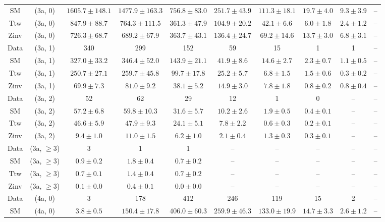 \begin{table}[h!]
{\begin{tabular}{cccccccccc}
	SM & (3a, 0) & $1605.7\pm 148.1$ & $1477.9\pm 163.3$ & $756.8\pm 83.0$ & $251.7\pm 43.9$ & $111.3\pm 18.1$ & $19.7\pm 4.0$ & $9.3\pm 3.9$ & -- \\[0.5ex] 
	Ttw & (3a, 0) & $847.9\pm 88.7$ & $764.3\pm 111.5$ & $361.3\pm 47.9$ & $104.9\pm 20.2$ & $42.1\pm 6.6$ & $6.0\pm 1.8$ & $2.4\pm 1.2$ & -- \\[0.5ex] 
	Zinv & (3a, 0) & $726.3\pm 68.7$ & $689.2\pm 67.9$ & $363.7\pm 43.1$ & $136.4\pm 24.7$ & $69.2\pm 14.6$ & $13.7\pm 3.0$ & $6.8\pm 3.1$ & -- \\[0.5ex] 
	Data & (3a, 1) & 340 & 299 & 152 & 59 & 15 & 1 & 1 & -- \\[0.5ex] 
	SM & (3a, 1) & $327.0\pm 33.2$ & $346.4\pm 52.0$ & $143.9\pm 21.1$ & $41.9\pm 8.6$ & $14.6\pm 2.7$ & $2.3\pm 0.7$ & $1.1\pm 0.5$ & -- \\[0.5ex] 
	Ttw & (3a, 1) & $250.7\pm 27.1$ & $259.7\pm 45.8$ & $99.7\pm 17.8$ & $25.2\pm 5.7$ & $6.8\pm 1.5$ & $1.5\pm 0.6$ & $0.3\pm 0.2$ & -- \\[0.5ex] 
	Zinv & (3a, 1) & $69.9\pm 7.3$ & $81.0\pm 9.2$ & $38.1\pm 5.2$ & $14.9\pm 3.0$ & $7.8\pm 1.8$ & $0.8\pm 0.2$ & $0.8\pm 0.4$ & -- \\[0.5ex] 
	Data & (3a, 2) & 52 & 62 & 29 & 12 & 1 & 0 & -- & -- \\[0.5ex] 
	SM & (3a, 2) & $57.2\pm 6.8$ & $59.8\pm 10.3$ & $31.6\pm 5.7$ & $10.2\pm 2.6$ & $1.9\pm 0.5$ & $0.4\pm 0.1$ & -- & -- \\[0.5ex] 
	Ttw & (3a, 2) & $46.6\pm 5.9$ & $47.9\pm 9.3$ & $24.1\pm 5.1$ & $7.8\pm 2.2$ & $0.6\pm 0.3$ & $0.2\pm 0.1$ & -- & -- \\[0.5ex] 
	Zinv & (3a, 2) & $9.4\pm 1.0$ & $11.0\pm 1.5$ & $6.2\pm 1.0$ & $2.1\pm 0.4$ & $1.3\pm 0.3$ & $0.3\pm 0.1$ & -- & -- \\[0.5ex] 
	Data & (3a, $\ge3$) & 3 & 1 & 1 & -- & -- & -- & -- & -- \\[0.5ex] 
	SM & (3a, $\ge3$) & $0.9\pm 0.2$ & $1.8\pm 0.4$ & $0.7\pm 0.2$ & -- & -- & -- & -- & -- \\[0.5ex] 
	Ttw & (3a, $\ge3$) & $0.7\pm 0.1$ & $1.4\pm 0.4$ & $0.7\pm 0.2$ & -- & -- & -- & -- & -- \\[0.5ex] 
	Zinv & (3a, $\ge3$) & $0.1\pm 0.0$ & $0.4\pm 0.1$ & $0.0\pm 0.0$ & -- & -- & -- & -- & -- \\[0.5ex] 
	Data & (4a, 0) & 3 & 178 & 412 & 246 & 119 & 15 & 2 & -- \\[0.5ex] 
	SM & (4a, 0) & $3.8\pm 0.5$ & $150.4\pm 17.8$ & $406.0\pm 60.3$ & $259.9\pm 46.3$ & $133.0\pm 19.9$ & $14.7\pm 3.3$ & $2.6\pm 1.2$ & -- \\[0.5ex] 

\end{tabular}}
\end{table}

